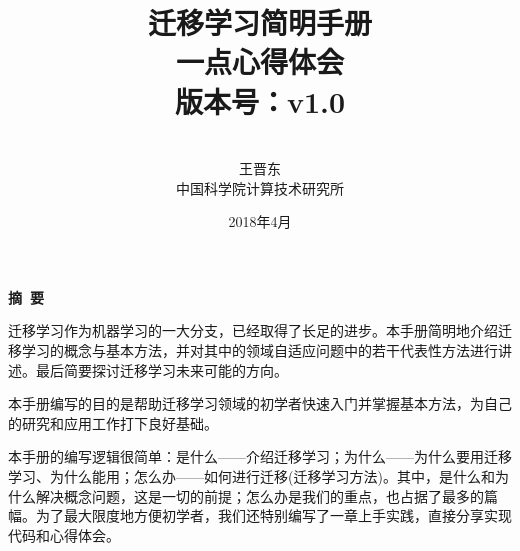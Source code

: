 \documentclass[a4paper]{article}
\begin{document}
\pagestyle{main}    %

\renewcommand{\refname}{参考文献} 
\renewcommand{\figurename}{图}
\renewcommand{\tablename}{表}
\renewcommand{\contentsname}{目录}
\renewcommand{\today}{\number\year 年 \number\month 月 \number\day 日}
\makeatletter

\renewcommand\tableofcontents{%
  \begin{multicols}{2}[%
    \section*{%
      \contentsname
      \@mkboth{\MakeUppercase\contentsname}{\MakeUppercase\contentsname}}]%
    \@starttoc{toc}%
\end{multicols}}
\makeatother


\title{{\Huge 迁移学习简明手册{\large\linebreak\\}}{\Large 一点心得体会\\版本号：v1.0\linebreak\linebreak
}}
\author{\\
  王晋东\\中国科学院计算技术研究所}
\date{2018年4月}
\maketitle
\thispagestyle{empty}

\newpage

\thispagestyle{empty}
\begin{center}
{\Large\bf{摘\ 要\\}}
\end{center}

迁移学习作为机器学习的一大分支，已经取得了长足的进步。本手册简明地介绍迁移学习的概念与基本方法，并对其中的领域自适应问题中的若干代表性方法进行讲述。最后简要探讨迁移学习未来可能的方向。

本手册编写的目的是帮助迁移学习领域的初学者快速入门并掌握基本方法，为自己的研究和应用工作打下良好基础。

本手册的编写逻辑很简单：是什么——介绍迁移学习；为什么——为什么要用迁移学习、为什么能用；怎么办——如何进行迁移(迁移学习方法)。其中，是什么和为什么解决概念问题，这是一切的前提；怎么办是我们的重点，也占据了最多的篇幅。为了最大限度地方便初学者，我们还特别编写了一章上手实践，直接分享实现代码和心得体会。
\newpage
\end{document}
